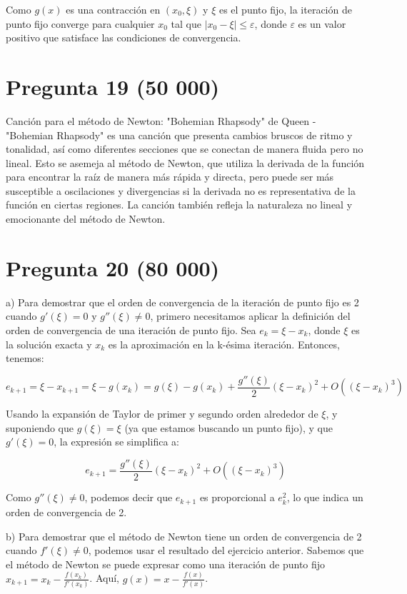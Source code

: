 \documentclass[a4paper,12pt]{article}
\begin{document}
Como \( g(x) \) es una contracción en \( (x_0, \xi) \) y \( \xi \) es el punto fijo, la iteración de punto fijo converge para cualquier \( x_0 \) tal que \( |x_0 - \xi| \leq \varepsilon \), donde \( \varepsilon \) es un valor positivo que satisface las condiciones de convergencia.


\section*{Pregunta 19 (50 000)}
Canción para el método de Newton: "Bohemian Rhapsody" de Queen
   - "Bohemian Rhapsody" es una canción que presenta cambios bruscos de ritmo y tonalidad, así como diferentes secciones que se conectan de manera fluida pero no lineal. Esto se asemeja al método de Newton, que utiliza la derivada de la función para encontrar la raíz de manera más rápida y directa, pero puede ser más susceptible a oscilaciones y divergencias si la derivada no es representativa de la función en ciertas regiones. La canción también refleja la naturaleza no lineal y emocionante del método de Newton.


\section*{Pregunta 20 (80 000)}

a) Para demostrar que el orden de convergencia de la iteración de punto fijo es 2 cuando \( g'(\xi) = 0 \) y \( g''(\xi) \neq 0 \), primero necesitamos aplicar la definición del orden de convergencia de una iteración de punto fijo. Sea \( e_k = \xi - x_k \), donde \( \xi \) es la solución exacta y \( x_k \) es la aproximación en la k-ésima iteración. Entonces, tenemos:

\[ e_{k+1} = \xi - x_{k+1} = \xi - g(x_k) = g(\xi) - g(x_k) + \frac{g''(\xi)}{2}(\xi - x_k)^2 + O((\xi - x_k)^3) \]

Usando la expansión de Taylor de primer y segundo orden alrededor de \( \xi \), y suponiendo que \( g(\xi) = \xi \) (ya que estamos buscando un punto fijo), y que \( g'(\xi) = 0 \), la expresión se simplifica a:

\[ e_{k+1} = \frac{g''(\xi)}{2}(\xi - x_k)^2 + O((\xi - x_k)^3) \]

Como \( g''(\xi) \neq 0 \), podemos decir que \( e_{k+1} \) es proporcional a \( e_k^2 \), lo que indica un orden de convergencia de 2.

b) Para demostrar que el método de Newton tiene un orden de convergencia de 2 cuando \( f'(\xi) \neq 0 \), podemos usar el resultado del ejercicio anterior. Sabemos que el método de Newton se puede expresar como una iteración de punto fijo \( x_{k+1} = x_k - \frac{f(x_k)}{f'(x_k)} \). Aquí, \( g(x) = x - \frac{f(x)}{f'(x)} \). 
\end{document}
